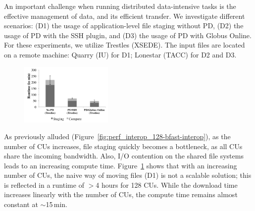 \documentclass[conference]{IEEEtran}
\begin{document}
    An important challenge
when running distributed data-intensive tasks is the effective
management of data, and its efficient transfer. We investigate
different scenarios: (D1) the usage of application-level file staging
without PD, (D2) the usage of PD with the SSH plugin,  and (D3) the usage of PD with Globus
Online. For these experiments, we utilize Trestles (XSEDE). The input
files are located on a remote machine: Quarry (IU) for D1; Lonestar
(TACC) for D2 and D3.


\begin{figure}[t]
	\upp
	\centering
		\includegraphics[width=0.4\textwidth]{../perf/sc/pd-128cus.pdf}
	\caption{}
	\label{fig:perf_sc_download-concurrent-cus}
\end{figure}


As previously alluded
(Figure~\ref{fig:perf_interop_128-bfast-interop}), as the number of
CUs increases, file staging quickly becomes a bottleneck, as all CUs
share the incoming bandwidth.  Also, I/O contention on the shared file
systems leads to an increasing compute time.
Figure~\ref{fig:perf_sc_download-concurrent-cus} shows that with an
increasing number of CUs, the naive way of moving files (D1) is not a
scalable solution; this is reflected in a runtime of $>$4 hours for 128
CUs.  While the download time increases linearly with the number of
CUs, the compute time remains almost constant at $\sim$15\,min.
\end{document}
